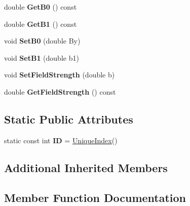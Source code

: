\begin{DoxyCompactItemize}
\mbox{\label{classSectorBend_ab8c30baa3668cad23e65265e57b070e6}} 
double {\bfseries Get\+B0} () const
\item 
\mbox{\label{classSectorBend_aba91d35855fd652284609239a41f00c8}} 
double {\bfseries Get\+B1} () const
\item 
\mbox{\label{classSectorBend_a1ae2978e8b7e42c28c131eedd44b6ab0}} 
void {\bfseries Set\+B0} (double By)
\item 
\mbox{\label{classSectorBend_a83302e6dda378625e7a07ea78b38c893}} 
void {\bfseries Set\+B1} (double b1)
\item 
\mbox{\label{classSectorBend_a8880c68356fd74b4ed182e9cf2980561}} 
void {\bfseries Set\+Field\+Strength} (double b)
\item 
\mbox{\label{classSectorBend_a34b579bb36e578f94d81c7c79da6f5ef}} 
double {\bfseries Get\+Field\+Strength} () const
\end{DoxyCompactItemize}
\subsection*{Static Public Attributes}
\begin{DoxyCompactItemize}
\item 
\mbox{\label{classSectorBend_a442ad5157a214a5e4972fc0cb1f2c321}} 
static const int {\bfseries ID} = \hyperlink{classAcceleratorComponent_aa7ad4d39e1a488b705983842ed1ac784}{Unique\+Index}()
\end{DoxyCompactItemize}
\subsection*{Additional Inherited Members}


\subsection{Member Function Documentation}
\mbox{\label{classSectorBend_a0f6e6636cd2db549f55f3d630223f9c6}} 
